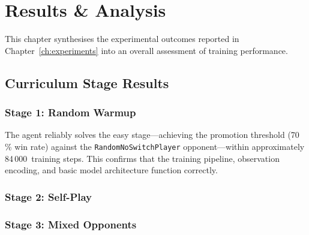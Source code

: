 \chapter{Results \& Analysis}
\label{ch:results}

This chapter synthesises the experimental outcomes reported in
Chapter~\ref{ch:experiments} into an overall assessment of training performance.

\section{Curriculum Stage Results}

\subsection{Stage 1: Random Warmup}

The agent reliably solves the easy stage---achieving the promotion threshold
(70\,\% win rate) against the \texttt{RandomNoSwitchPlayer} opponent---within
approximately 84\,000~training steps.  This confirms that the training
pipeline, observation encoding, and basic model architecture function
correctly.


\subsection{Stage 2: Self-Play}


\subsection{Stage 3: Mixed Opponents}

